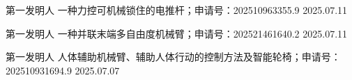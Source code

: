
\begin{cvhonors}

  \cvhonor
    {第一发明人}
    {一种力控可机械锁住的电推杆；申请号：202510963355.9}
    {}
    {2025.07.11}

  \cvhonor
    {第一发明人}
    {一种并联末端多自由度机械臂；申请号：202521461640.2}
    {}
    {2025.07.11}

  \cvhonor
    {第一发明人}
    {人体辅助机械臂、辅助人体行动的控制方法及智能轮椅；申请号：202510931694.9}
    {}
    {2025.07.07}

\end{cvhonors}
